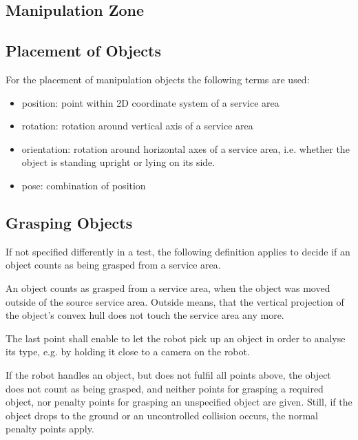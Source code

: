 \subsection{Manipulation Zone}

\subsection{Placement of Objects}
For the placement of manipulation objects the following terms are used:

\begin{itemize}
\item position: point within 2D coordinate system of a service area
\item rotation: rotation around vertical axis of a service area
\item orientation: rotation around horizontal axes of a service area, i.e. whether the object is standing upright or lying on its side.
\item pose: combination of position
\end{itemize}

\subsection{Grasping Objects} \label{ssec:GraspingObjects}
If not specified differently in a test, the following definition applies to decide if an object counts as being grasped from a service area.
\par
An object counts as grasped from a service area, when
 the object was moved outside of the source service area. Outside means, that the vertical projection of the object’s convex hull does not touch the service area any more.

\par
The last point shall enable to let the robot pick up an object in order to analyse its type, e.g. by holding it close to a camera on the robot.
\par
If the robot handles an object, but does not fulfil all points above, the object does not count as being grasped, and neither points for grasping a required object, nor penalty points for grasping an unspecified object are given. Still, if the object drops to the ground or an uncontrolled collision occurs, the normal penalty points apply.

